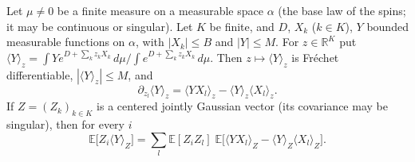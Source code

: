 \begin{lemma}\label{lem:sg-tal:gibbs-ibp-linear}
\leanok
{}
Let $\mu\ne0$ be a finite measure on a measurable space $\alpha$ (the base law of the spins; it may be continuous or singular). Let $K$ be finite, and $D$, $X_k$ ($k\in K$), $Y$ bounded measurable functions on $\alpha$, with $|X_k|\le B$ and $|Y|\le M$.
For $z\in\mathbb R^K$ put $\langle Y\rangle_z=\int Y e^{D+\sum_k z_kX_k}\,d\mu\big/\int e^{D+\sum_k z_kX_k}\,d\mu$. Then $z\mapsto\langle Y\rangle_z$ is Fr\'echet differentiable, $|\langle Y\rangle_z|\le M$, and
\[
\partial_{z_l}\langle Y\rangle_z=\langle YX_l\rangle_z-\langle Y\rangle_z\langle X_l\rangle_z .
\]
If $Z=(Z_k)_{k\in K}$ is a centered jointly Gaussian vector (its covariance may be singular), then for every $i$
\[
\mathbb E\bigl[Z_i\langle Y\rangle_Z\bigr]=\sum_{l}\mathbb E[Z_iZ_l]\;\mathbb E\bigl[\langle YX_l\rangle_Z-\langle Y\rangle_Z\langle X_l\rangle_Z\bigr].
\]
\end{lemma}
